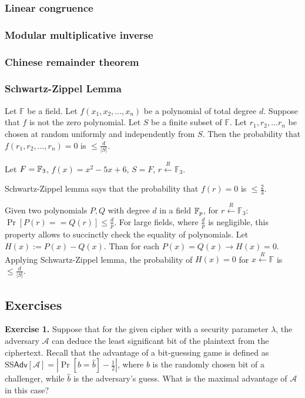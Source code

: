 \documentclass[../lecture-notes.tex]{subfiles}
\begin{document}
\subsubsection{Linear congruence}

\subsubsection{Modular multiplicative inverse}

\subsubsection{Chinese remainder theorem}

\subsubsection{Schwartz-Zippel Lemma}

\begin{lemma}\label{lemma:sz}
Let $\mathbb{F}$ be a field. Let $f(x_1, x_2, ..., x_n)$ be a polynomial of total degree $d$. Suppose that $f$ is not the zero polynomial. Let $S$ be
a finite subset of $\mathbb{F}$. Let $r_1, r_2, ... r_n$ be chosen at random uniformly and independently from $S$. Then the probability that 
$f(r_1, r_2, ..., r_n) = 0$ is $\le \frac{d}{|S|}$.
\end{lemma}

\begin{example}
Let $F = \mathbb{F}_3$, $f(x) = x^2 - 5x + 6$, $S = F$, $r \xleftarrow{R} \mathbb{F}_3$.

Schwartz-Zippel lemma says that the probability that $f(r) = 0$ is $\le \frac{2}{3}$.
\end{example}

Given two polynomials $P, Q$ with  degree $d$ in a field $\mathbb{F}_p$, for $r \xleftarrow{R} \mathbb{F}_3$: $\Pr[P(r) == Q(r)] \le \frac{d}{p}$.
For large fields, where  $\frac{d}{p}$ is negligible, this property allows to succinctly check the equality of polynomials.
Let $H(x) := P(x) - Q(x)$. Than for each $P(x) = Q(x) \rightarrow H(x) = 0$. Applying Schwartz-Zippel lemma, 
the probability of $H(x) = 0$ for $x \xleftarrow{R} \mathbb{F} $ is $\le \frac{d}{|S|}$.

\subsection{Exercises}

\textbf{Exercise 1.} Suppose that for the given cipher with a security parameter $\lambda$, the adversary $\mathcal{A}$ can deduce the least significant bit of the plaintext from the ciphertext. Recall that the advantage 
of a bit-guessing game is defined as $\text{SS}\mathsf{Adv}[\mathcal{A}] = \left|\Pr[b=\hat{b}] - \frac{1}{2}\right|$, where $b$ is the randomly chosen bit of a challenger, while 
$\hat{b}$ is the adversary's guess. What is the maximal advantage of $\mathcal{A}$ in this case?
\end{document}
